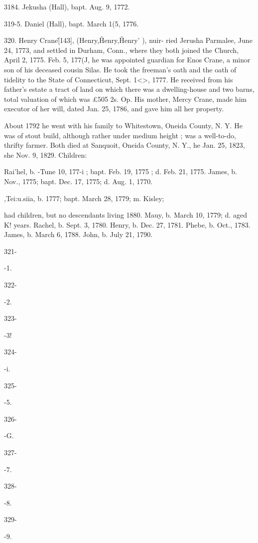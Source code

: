 3184. Jekusha (Hall), bapt. Aug. 9, 1772. 

319-5. Daniel (Hall), bapt. March 1(5, 1776. 

320. Henry Crane\^ [143], (Henry,\^ Henry,\^ Henry' ), nuir- 
ried Jerusha Parmalee, June 24, 1773, and settled in Durham, 
Conn., where they both joined the Church, April 2, 1775. Feb. 
5, 177(J, he was appointed guardian for Enos Crane, a minor son 
of his deceased cousin Silas. He took the freeman's oath and 
the oath of tidelity to the State of Connecticut, Sept. 1<>, 1777. 
He received from his father's estate a tract of land on which there 
was a dwelling-house and two barns, total valuation of which was 
£505  2s.  Op. His mother, Mercy Crane, made him executor 
of her will, dated Jan. 25, 1786, and gave him all her property. 




About 1792 he went with his family to Whitestown, Oneida 
County, N. Y. He was of stout build, although rather under 
medium height ; was a well-to-do, thrifty farmer. Both died at 
Sanquoit, Oneida County, N. Y., he Jan. 25, 1823, she Nov. 9, 
1829. Children: 

Rai'hel, b. -Tune 10, 177-i ; bapt. Feb. 19, 1775 ; d. Feb. 21, 1775. 
James, b. Nov., 1775; bapt. Dec. 17, 1775; d. Aug. 1, 1770. 

,Tei:u.siia, b. 1777; bapt. March 28, 1779; m. Kisley; 

had children, but no descendants living 1880. 
Mauy, b. March 10, 1779; d. aged K! years. 
Rachel, b. Sept. 3, 1780. 
Henry, b. Dec. 27, 1781. 
Phebe, b. Oct., 1783. 
James, b. March 6, 1788. 
John, b. July 21, 1790. 



321- 


-1. 


322- 


-2. 


323- 


-3! 


324- 


-i. 


325- 


-5. 


326- 


-G. 


327- 


-7. 


328- 


-8. 


329- 


-9. 



